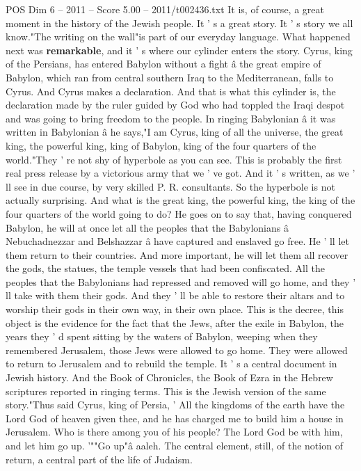 \begin{textsample}{POS Dim 6 – 2011 – Score 5.00 – 2011/t002436.txt}
It is, of course, a great moment in the history of the Jewish people.
It ' s a great story.
It ' s story we all know."The writing on the wall"is part of our everyday language.
What happened next was \textbf{remarkable}, and it ' s where our cylinder enters the story.
Cyrus, king of the Persians, has entered Babylon without a fight â the great empire of Babylon, which ran from central southern Iraq to the Mediterranean, falls to Cyrus.
And Cyrus makes a declaration.
And that is what this cylinder is, the declaration made by the ruler guided by God who had toppled the Iraqi despot and was going to bring freedom to the people.
In ringing Babylonian â it was written in Babylonian â he says,"I am Cyrus, king of all the universe, the great king, the powerful king, king of Babylon, king of the four quarters of the world."They ' re not shy of hyperbole as you can see.
This is probably the first real press release by a victorious army that we ' ve got.
And it ' s written, as we ' ll see in due course, by very skilled P.
R. consultants.
So the hyperbole is not actually surprising.
And what is the great king, the powerful king, the king of the four quarters of the world going to do?
He goes on to say that, having conquered Babylon, he will at once let all the peoples that the Babylonians â Nebuchadnezzar and Belshazzar â have captured and enslaved go free.
He ' ll let them return to their countries.
And more important, he will let them all recover the gods, the statues, the temple vessels that had been confiscated.
All the peoples that the Babylonians had repressed and removed will go home, and they ' ll take with them their gods.
And they ' ll be able to restore their altars and to worship their gods in their own way, in their own place.
This is the decree, this object is the evidence for the fact that the Jews, after the exile in Babylon, the years they ' d spent sitting by the waters of Babylon, weeping when they remembered Jerusalem, those Jews were allowed to go home.
They were allowed to return to Jerusalem and to rebuild the temple.
It ' s a central document in Jewish history.
And the Book of Chronicles, the Book of Ezra in the Hebrew scriptures reported in ringing terms.
This is the Jewish version of the same story."Thus said Cyrus, king of Persia, ' All the kingdoms of the earth have the Lord God of heaven given thee, and he has charged me to build him a house in Jerusalem.
Who is there among you of his people?
The Lord God be with him, and let him go up. '""Go up"â aaleh.
The central element, still, of the notion of return, a central part of the life of Judaism.

\end{textsample}
